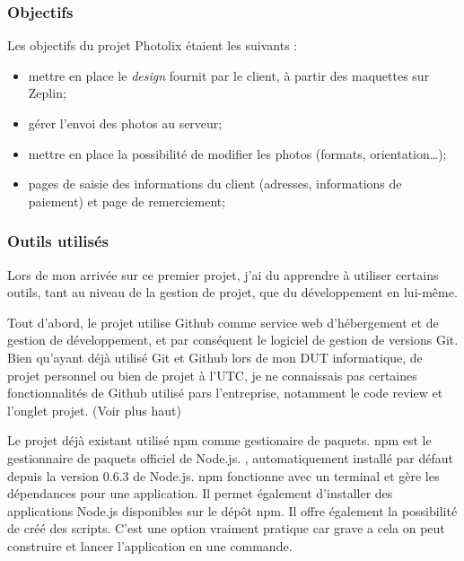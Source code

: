 \subsubsection{Objectifs}\label{objectifs}

\bigskip

Les objectifs du projet Photolix étaient les suivants :

\begin{itemize}
\tightlist
\item
  mettre en place le \emph{design} fournit par le client, à partir des
  maquettes sur Zeplin;
\item
  gérer l'envoi des photos au serveur;
\item
  mettre en place la possibilité de modifier les photos (formats,
  orientation\ldots{});
\item
  pages de saisie des informations du client (adresses, informations de
  paiement) et page de remerciement;
\end{itemize}

\bigskip

\subsubsection{Outils utilisés}\label{outils-utilisuxe9s}

\bigskip

Lors de mon arrivée sur ce premier projet, j'ai du apprendre à utiliser
certains outils, tant au niveau de la gestion de projet, que du
développement en lui-même.

\bigskip

Tout d'abord, le projet utilise Github comme service web d'hébergement
et de gestion de développement, et par conséquent le logiciel de gestion
de versions Git. Bien qu'ayant déjà utilisé Git et Github lors de mon
DUT informatique, de projet personnel ou bien de projet à l'UTC, je ne
connaissais pas certaines fonctionnalités de Github utilisé pars
l'entreprise, notamment le code review et l'onglet projet. (Voir plus
haut)

\bigskip

Le projet déjà existant utilisé npm comme gestionaire de paquets. npm
est le gestionnaire de paquets officiel de Node.js. , automatiquement
installé par défaut depuis la version 0.6.3 de Node.js. npm fonctionne
avec un terminal et gère les dépendances pour une application. Il permet
également d'installer des applications Node.js disponibles sur le dépôt
npm. Il offre également la possibilité de créé des scripts. C'est une
option vraiment pratique car grave a cela on peut construire et lancer
l'application en une commande.


